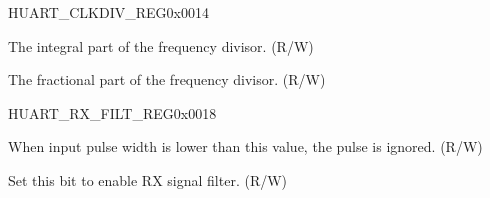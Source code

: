 \begin{register}{H}{UART\_CLKDIV\_REG}{0x0014}\label{regdesc:UARTCLKDIVREG}
%
%
%
%
\regnewline%
\begin{regdesc}\begin{reglist}
\label{fielddesc:UARTCLKDIV}\item [UART\_CLKDIV] The integral part of the frequency divisor. (R/W)
\label{fielddesc:UARTCLKDIVFRAG}\item [UART\_CLKDIV\_FRAG] The fractional part of the frequency divisor. (R/W)
\end{reglist}\end{regdesc}
\end{register}


\begin{register}{H}{UART\_RX\_FILT\_REG}{0x0018}\label{regdesc:UARTRXFILTREG}
%
%
%
\regnewline%
\begin{regdesc}\begin{reglist}
\label{fielddesc:UARTGLITCHFILT}\item [UART\_GLITCH\_FILT] When input pulse width is lower than this value, the pulse is ignored. (R/W)
\label{fielddesc:UARTGLITCHFILTEN}\item [UART\_GLITCH\_FILT\_EN] Set this bit to enable RX signal filter. (R/W)
\end{reglist}\end{regdesc}
\end{register}



